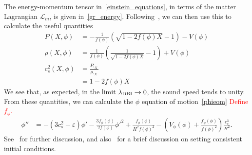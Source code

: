 The energy-momentum tensor in~\eqref{einstein_equations}, in terms of the matter Lagrangian $\mathcal{L}_m$,
is given in~\eqref{gr_energy}.
    Following~\cite{Christopherson_2009, mukhanov_1999},
    we can then use this to calculate the useful quantities
    \begin{align}
        P(X, \phi) &= -\frac{1}{f(\phi)}\left(\sqrt{1-2f(\phi)X}-1\right)-V(\phi)\\
        \rho(X, \phi) &= \frac{1}{f(\phi)}\left(\frac{1}{\sqrt{1-2f(\phi)X}}-1\right)+V(\phi)\\
        c^2_s(X, \phi) &= \frac{P,_X}{\rho,_X}\\
                    &= 1-2f(\phi)X
    \end{align}
    We see that, as expected, in the limit $\lambda_{\text{DBI}}\rightarrow 0$, the sound
    speed tends to unity.
    From these quantities, we can calculate the $\phi$ equation of motion~\eqref{phieom}
    \textcolor{red}{Define $f_\phi$.}
    \begin{align}
        \phi'' &= -(3c_s^2-\varepsilon)\phi'
                -\frac{3f_\phi(\phi)}{2f(\phi)}\phi'^2
                +\frac{f_\phi(\phi)}{H^2f(\phi)^2}
                -\left(V_\phi(\phi)+\frac{f_\phi(\phi)}{f(\phi)^2}\right)\frac{c_s^3}{H^2}.
    \end{align}
    See~\cite{dbi_silverstein, warp_features_dbi} for further discussion,
    and also~\cite{cmb_pol_ics} for a brief discussion on setting consistent initial conditions.


